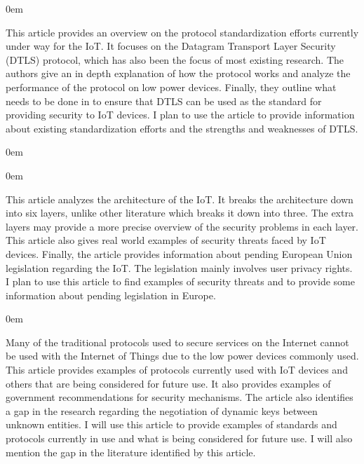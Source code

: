 \documentclass{article}
\newenvironment{annotation}{\begin{addmargin}[2.5em]{0em} \begin{flushleft}}{\end{flushleft} \end{addmargin}}
\begin{document}
\begin{annotation}
This article provides an overview on the protocol standardization efforts currently under way for the IoT. It focuses on the Datagram Transport Layer Security (DTLS) protocol, which has also been the focus of most
existing research. The authors give an in depth explanation of how the protocol works and analyze the performance of the protocol on low power devices. Finally, they outline what needs to be done in to 
ensure that DTLS can be used as the standard for providing security to IoT devices. I plan to use the article to provide information about existing standardization efforts and the strengths and weaknesses of DTLS. 
\end{annotation}

\newpage
{}
\begin{annotation}

\end{annotation}

\begin{annotation}
This article analyzes the architecture of the IoT. It breaks the architecture down into six layers, unlike other literature which breaks it down into three. The extra layers may provide a more precise overview of the security problems in each layer. This article also gives real world examples of security threats faced by IoT devices. Finally, the article provides information about pending European Union legislation regarding the IoT. The legislation mainly involves user privacy rights. I plan to use this article to find examples of security threats and to provide some information about pending legislation in Europe. 
\end{annotation}

\begin{annotation}
Many of the traditional protocols used to secure services on the Internet cannot be used with the Internet of Things due to the low power devices commonly used. This article provides examples of protocols
currently used with IoT devices and others that are being considered for future use. It also provides examples of government recommendations for security mechanisms. The article also identifies a gap in the 
research regarding the negotiation of dynamic keys between unknown entities. I will use this article to provide examples of standards and protocols currently in use and what is being considered for future use. I will also mention the gap in the literature identified by this article.
\end{annotation}
\end{document}
